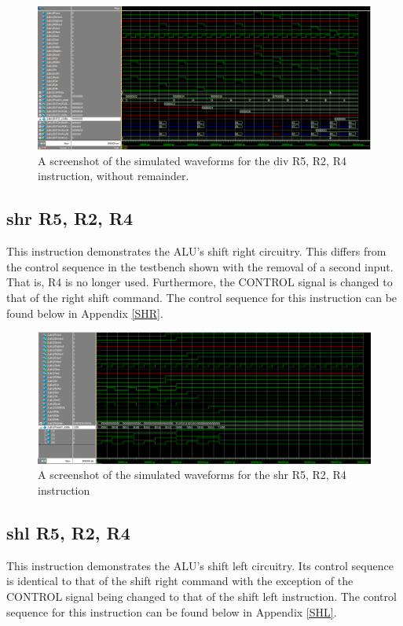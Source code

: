 \documentclass{article}
\begin{document}
    \begin{figure}[h!]
        \begin{center}
            \includegraphics[width=15cm]{DIV_final_image.png}
            \caption{A screenshot of the simulated waveforms for the div R5, R2, R4 instruction, without remainder.}
        \end{center}
    \end{figure}

    \subsection{shr R5, R2, R4}
    This instruction demonstrates the ALU's shift right circuitry. This differs from the control sequence in the testbench shown with the removal of a second input. That is, R4 is no longer used. Furthermore, the CONTROL signal is changed to that of the right shift command. The control sequence for this instruction can be found below in Appendix \ref{SHR}.
    
    \begin{figure}[h!]
        \begin{center}
            \includegraphics[width=15cm]{shr}
            \caption{A screenshot of the simulated waveforms for the shr R5, R2, R4 instruction}
        \end{center}
    \end{figure}

    \subsection{shl R5, R2, R4}
    This instruction demonstrates the ALU's shift left circuitry. Its control sequence is identical to that of the shift right command with the exception of the CONTROL signal being changed to that of the shift left instruction. The control sequence for this instruction can be found below in Appendix \ref{SHL}.
\end{document}
